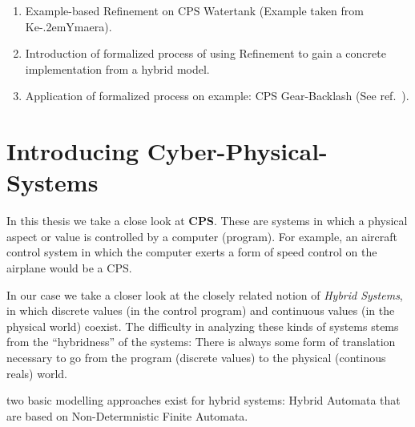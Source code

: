 \begin{enumerate}[label=\bfseries \Roman*:]

\item Example-based Refinement on CPS Watertank (Example taken from Ke\kern-.2emYmaera).
\item Introduction of formalized process of using Refinement to gain a concrete implementation from a hybrid model.
\item Application of formalized process on example: CPS Gear-Backlash (See ref.~\cite{bla}).
\end{enumerate}

\section{Introducing Cyber-Physical-Systems}
In this thesis we take a close look at \textbf{CPS}. These are systems in which a physical aspect or value is controlled by a computer (program). For example, an aircraft control system in which the computer exerts a form of speed control on the airplane would be a CPS. 

In our case we take a closer look at the closely related notion of \textit{Hybrid Systems}, in which discrete values (in the control program) and continuous values (in the physical world) coexist. The difficulty in analyzing these kinds of systems stems from the ``hybridness'' of the systems: There is always some form of translation necessary to go from the program (discrete values) to the physical (continous reals) world. 

 two basic modelling approaches exist for hybrid systems: Hybrid Automata that are based on Non-Determnistic Finite Automata.





